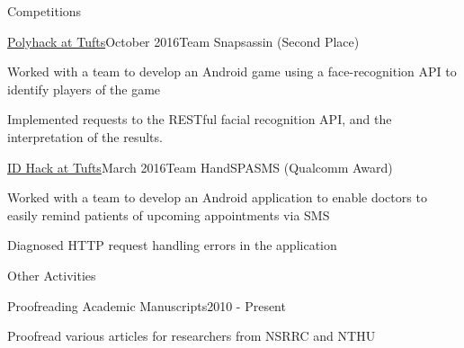 \documentclass{resume} %
\begin{document}
\begin{rSection}{Competitions}

\begin{rSubsection}{\href{http://2016.polyhack.tufts.io/}{Polyhack at
    Tufts}}{October 2016}{Team Snapsassin (Second Place)}

\item Worked with a team to develop an Android game using a face-recognition
    API to identify players of the game

\item Implemented requests to the RESTful facial recognition API, and the
    interpretation of the results.

\end{rSubsection}

\begin{rSubsection}{\href{https://idhack16.devpost.com/}{ID Hack at
    Tufts}}{March 2016}{Team HandSPASMS (Qualcomm Award)}

\item Worked with a team to develop an Android application to enable doctors
    to easily remind patients of upcoming appointments via SMS

\item Diagnosed HTTP request handling errors in the application

\end{rSubsection}
\end{rSection}

\begin{rSection}{Other Activities}

\begin{rSubsection}{Proofreading Academic Manuscripts}{2010 - Present}{}
\item Proofread various articles for researchers from NSRRC and NTHU
\end{rSubsection}

\smallskip
\end{rSection}





\end{document}
